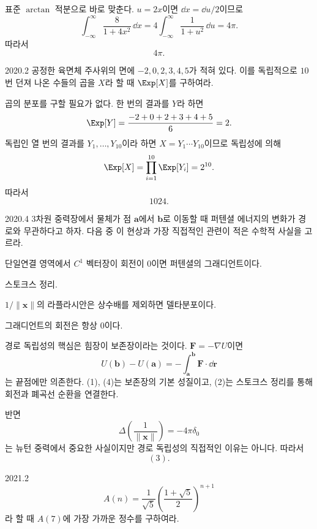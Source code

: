 \begin{solution}
표준 $\arctan$ 적분으로 바로 맞춘다. $u=2x$이면 $\dd x=\dd u/2$이므로
\[
\int_{-\infty}^{\infty}\frac{8}{1+4x^2}\,\dd x
=4\int_{-\infty}^{\infty}\frac{1}{1+u^2}\,\dd u
=4\pi.
\]
따라서
\[
\boxed{4\pi}.
\]
\end{solution}

\begin{pastproblem}{2020.2}
공정한 육면체 주사위의 면에 $-2,0,2,3,4,5$가 적혀 있다. 이를 독립적으로 $10$번 던져 나온 수들의 곱을 $X$라 할 때 $\Exp[X]$를 구하여라.
\end{pastproblem}

\begin{solution}
곱의 분포를 구할 필요가 없다. 한 번의 결과를 $Y$라 하면
\[
\Exp[Y]=\frac{-2+0+2+3+4+5}{6}=2.
\]
독립인 열 번의 결과를 $Y_1,\ldots,Y_{10}$이라 하면 $X=Y_1\cdots Y_{10}$이므로 독립성에 의해
\[
\Exp[X]=\prod_{i=1}^{10}\Exp[Y_i]=2^{10}.
\]
따라서
\[
\boxed{1024}.
\]
\end{solution}

\begin{pastproblem}{2020.4}
3차원 중력장에서 물체가 점 $\mathbf a$에서 $\mathbf b$로 이동할 때 퍼텐셜 에너지의 변화가 경로와 무관하다고 하자. 다음 중 이 현상과 가장 직접적인 관련이 적은 수학적 사실을 고르라.
\begin{problemchoices}
\item 단일연결 영역에서 $C^1$ 벡터장이 회전이 $0$이면 퍼텐셜의 그래디언트이다.
\item 스토크스 정리.
\item $1/\|\mathbf x\|$의 라플라시안은 상수배를 제외하면 델타분포이다.
\item 그래디언트의 회전은 항상 $0$이다.
\end{problemchoices}
\end{pastproblem}

\begin{solution}
경로 독립성의 핵심은 힘장이 보존장이라는 것이다. $\mathbf F=-\nabla U$이면
\[
U(\mathbf b)-U(\mathbf a)
=-\int_{\mathbf a}^{\mathbf b}\mathbf F\cdot\dd\mathbf r
\]
는 끝점에만 의존한다. (1), (4)는 보존장의 기본 성질이고, (2)는 스토크스 정리를 통해 회전과 폐곡선 순환을 연결한다.

반면
\[
\Delta\!\left(\frac1{\|\mathbf x\|}\right)=-4\pi\delta_0
\]
는 뉴턴 중력에서 중요한 사실이지만 경로 독립성의 직접적인 이유는 아니다. 따라서
\[
\boxed{(3)}.
\]
\end{solution}

\begin{pastproblem}{2021.2}
\[
A(n)=\frac1{\sqrt5}\left(\frac{1+\sqrt5}{2}\right)^{n+1}
\]
라 할 때 $A(7)$에 가장 가까운 정수를 구하여라.
\end{pastproblem}

